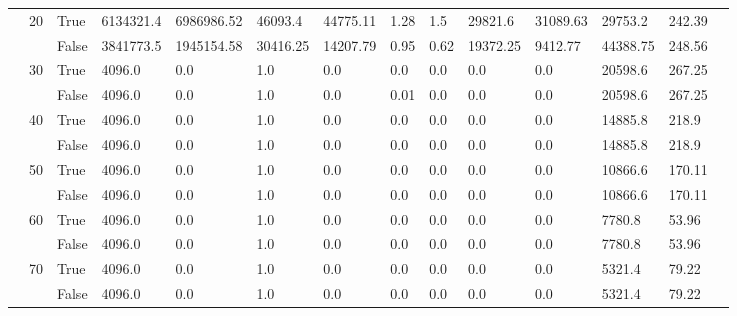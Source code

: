\begin{appendices}
\begin{landscape}
\begin{small}
\begin{longtable}[c]{@{}lll|ll|ll|ll|ll|lll@{}}
   & 20 & True  & 6134321.4       & 6986986.52     & 46093.4       & 44775.11      & 1.28          & 1.5           & 29821.6       & 31089.63      & 29753.2       & 242.39      &  \\
   &    & False & 3841773.5       & 1945154.58     & 30416.25      & 14207.79      & 0.95          & 0.62          & 19372.25      & 9412.77       & 44388.75      & 248.56      &  \\
   & 30 & True  & 4096.0          & 0.0            & 1.0           & 0.0           & 0.0           & 0.0           & 0.0           & 0.0           & 20598.6       & 267.25      &  \\
   &    & False & 4096.0          & 0.0            & 1.0           & 0.0           & 0.01          & 0.0           & 0.0           & 0.0           & 20598.6       & 267.25      &  \\
   & 40 & True  & 4096.0          & 0.0            & 1.0           & 0.0           & 0.0           & 0.0           & 0.0           & 0.0           & 14885.8       & 218.9       &  \\
   &    & False & 4096.0          & 0.0            & 1.0           & 0.0           & 0.0           & 0.0           & 0.0           & 0.0           & 14885.8       & 218.9       &  \\
   & 50 & True  & 4096.0          & 0.0            & 1.0           & 0.0           & 0.0           & 0.0           & 0.0           & 0.0           & 10866.6       & 170.11      &  \\
   &    & False & 4096.0          & 0.0            & 1.0           & 0.0           & 0.0           & 0.0           & 0.0           & 0.0           & 10866.6       & 170.11      &  \\
   & 60 & True  & 4096.0          & 0.0            & 1.0           & 0.0           & 0.0           & 0.0           & 0.0           & 0.0           & 7780.8        & 53.96       &  \\
   &    & False & 4096.0          & 0.0            & 1.0           & 0.0           & 0.0           & 0.0           & 0.0           & 0.0           & 7780.8        & 53.96       &  \\
   & 70 & True  & 4096.0          & 0.0            & 1.0           & 0.0           & 0.0           & 0.0           & 0.0           & 0.0           & 5321.4        & 79.22       &  \\
   &    & False & 4096.0          & 0.0            & 1.0           & 0.0           & 0.0           & 0.0           & 0.0           & 0.0           & 5321.4        & 79.22       &  \\

\end{longtable}
\end{small}
\end{landscape}
\end{appendices}

